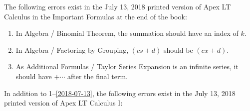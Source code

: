 \documentclass{amsart}
\begin{document}
\newpage

\noindent
The following errors exist in the July 13, 2018 printed version of Apex LT Calculus in the Important Formulas at the end of the book:
\begin{enumerate}
\item In Algebra / Binomial Theorem, the summation should have an index of $k$.
\item In Algebra / Factoring by Grouping, $(cs+d)$ should be $(cx+d)$.
\item As Additional Formulas / Taylor Series Expansion is an infinite series, it should have $+\dotsb$ after the final term.
\label{2018-07-13}
\end{enumerate}\bigskip

In addition to 1--\ref{2018-07-13}, the following errors exist in the July 13, 2018 printed version of Apex LT Calculus I:\\[-2\baselineskip]
\end{document}
